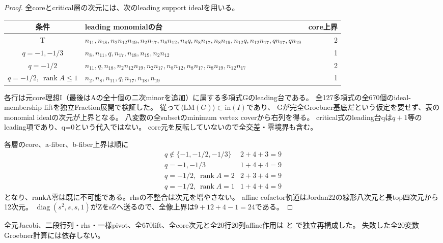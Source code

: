 \documentclass[a4paper,11pt]{ltjsarticle}
\theoremstyle{definition}
\begin{document}
\begin{proof}
全coreとcritical層の次元には、次のleading support idealを用いる。
\begin{center}\scriptsize
\begin{tabular}{c|p{10.3cm}|r}
条件&leading monomialの台&core上界\\\hline
T&$n_{11},\allowbreak n_{18},\allowbreak n_2n_{12}n_{19},\allowbreak n_2n_{17},\allowbreak n_8n_{12},\allowbreak n_8q,\allowbreak n_8n_{17},\allowbreak n_8n_{19},\allowbreak n_{12}q,\allowbreak n_{12}n_{17},\allowbreak qn_{17},\allowbreak qn_{19}$&2\\
$q=-1,\allowbreak -1/3$&$n_8,\allowbreak n_{11},\allowbreak q,\allowbreak n_{17},\allowbreak n_{18},\allowbreak n_{19},\allowbreak n_2n_{12}$&1\\
$q=-1/2$&$n_{11},\allowbreak q,\allowbreak n_{18},\allowbreak n_2n_{12}n_{19},\allowbreak n_2n_{17},\allowbreak n_8n_{12},\allowbreak n_8n_{17},\allowbreak n_8n_{19},\allowbreak n_{12}n_{17}$&2\\
$q=-1/2,\allowbreak \ \operatorname{rank}A\le1$&$n_2,\allowbreak n_8,\allowbreak n_{11},\allowbreak q,\allowbreak n_{17},\allowbreak n_{18},\allowbreak n_{19}$&1
\end{tabular}
\end{center}
各行は元core理想I（最後はAの全十個の二次minorを追加）に属する多項式Gのleading台である。
全127多項式の全670個のideal-membership liftを独立Fraction展開で検証した。
従って$\langle\mathrm{LM}(G)\rangle\subset\mathrm{in}(I)$であり、
Gが完全Groebner基底だという仮定を要せず、表のmonomial idealの次元が上界となる。
八変数の全subsetのminimum vertex coverから右列を得る。
critical式のleading台qは$q+1$等のleading項であり、q=0という代入ではない。
core元を反転していないので全交差・零境界も含む。

各層のcore、a-fiber、b-fiber上界は順に
\[
\begin{array}{c|c}
 q\notin\{-1,-1/2,-1/3\}&2+4+3=9\\
 q=-1,-1/3&1+4+4=9\\
 q=-1/2,\ \operatorname{rank}A=2&2+3+4=9\\
 q=-1/2,\ \operatorname{rank}A=1&1+4+4=9
\end{array}
\]
となり、rankA零は既に不可能である。rhsの不整合は次元を増やさない。
affine cofactor軌道はJordan22の線形八次元と長top四次元から12次元。
$\operatorname{diag}(s^2,s,s,1)$がZをsZへ送るので、全像上界は$9+12+4-1=24$である。
\end{proof}
全元Jacobi、二段行列・rhs・一様pivot、全670lift、全core次元と全20行20列affine作用は
と
で独立再構成した。
失敗した全20変数Groebner計算には依存しない。
\end{document}
